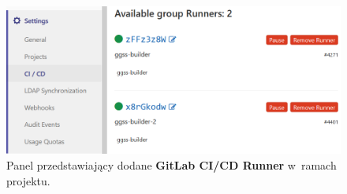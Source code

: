 \begin{figure}
\includegraphics[width=\textwidth]{res/png/runnerAdded}
\caption{Panel przedstawiający dodane \textbf{GitLab CI/CD Runner} w~ramach projektu.}
\label{fig:runner}
\end{figure}
